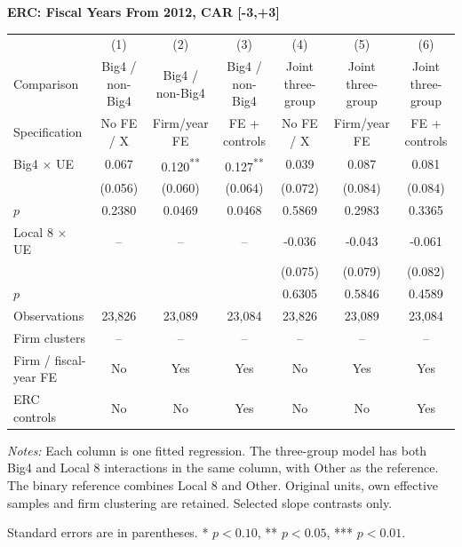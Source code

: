 \documentclass[10pt]{article}
\newcommand{\sym}[1]{\textsuperscript{#1}}
\begin{document}
\begin{minipage}{23.60cm}
\fontsize{10}{12}\selectfont
\setlength{\tabcolsep}{4pt}\renewcommand{\arraystretch}{1.08}
{\large\bfseries ERC: Fiscal Years From 2012, CAR [-3,+3]}\par\medskip
\begin{tabular*}{\linewidth}{@{\extracolsep{\fill}}lcccccc@{}}
\toprule
 & (1) & (2) & (3) & (4) & (5) & (6) \\
Comparison & Big4 / non-Big4 & Big4 / non-Big4 & Big4 / non-Big4 & Joint three-group & Joint three-group & Joint three-group \\
Specification & No FE / X & Firm/year FE & FE + controls & No FE / X & Firm/year FE & FE + controls \\
\midrule
Big4 $\times$ UE & 0.067 & 0.120\sym{**} & 0.127\sym{**} & 0.039 & 0.087 & 0.081 \\
 & (0.056) & (0.060) & (0.064) & (0.072) & (0.084) & (0.084) \\
$p$ & 0.2380 & 0.0469 & 0.0468 & 0.5869 & 0.2983 & 0.3365 \\
Local 8 $\times$ UE & -- & -- & -- & -0.036 & -0.043 & -0.061 \\
 &  &  &  & (0.075) & (0.079) & (0.082) \\
$p$ &  &  &  & 0.6305 & 0.5846 & 0.4589 \\
\midrule
Observations & 23,826 & 23,089 & 23,084 & 23,826 & 23,089 & 23,084 \\
Firm clusters & -- & -- & -- & -- & -- & -- \\
Firm / fiscal-year FE & No & Yes & Yes & No & Yes & Yes \\
ERC controls & No & No & Yes & No & No & Yes \\
\bottomrule\end{tabular*}\par\medskip
\fontsize{9}{11}\selectfont\textit{Notes:} Each column is one fitted regression. The three-group model has both Big4 and Local 8 interactions in the same column, with Other as the reference. The binary reference combines Local 8 and Other. Original units, own effective samples and firm clustering are retained. Selected slope contrasts only.
\par Standard errors are in parentheses. * $p<0.10$, ** $p<0.05$, *** $p<0.01$.
\end{minipage}
\end{document}
